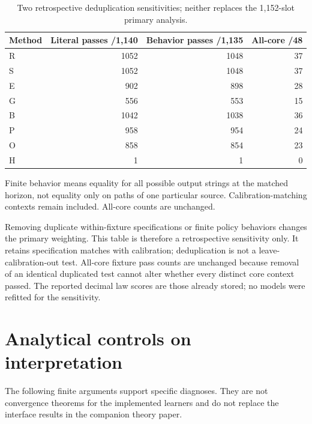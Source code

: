 \begin{table}[tbp]
\centering
\caption{Two retrospective deduplication sensitivities; neither replaces the 1,152-slot primary analysis.}\label{tab:dedup}
\small
\setlength{\tabcolsep}{5pt}
\begin{tabular}{lrrr}
\toprule
Method & Literal passes /1,140 & Behavior passes /1,135 & All-core /48 \\
\midrule
R & 1052 & 1048 & 37 \\
S & 1052 & 1048 & 37 \\
E & 902 & 898 & 28 \\
G & 556 & 553 & 15 \\
B & 1042 & 1038 & 36 \\
P & 958 & 954 & 24 \\
O & 858 & 854 & 23 \\
H & 1 & 1 & 0 \\
\bottomrule
\end{tabular}
\par\smallskip\begin{minipage}{\linewidth}\footnotesize Finite behavior means equality for all possible output strings at the matched horizon, not equality only on paths of one particular source. Calibration-matching contexts remain included. All-core counts are unchanged.\end{minipage}
\end{table}


\FloatBarrier
Removing duplicate within-fixture specifications or finite policy behaviors changes the primary weighting. This table is therefore a retrospective sensitivity only. It retains specification matches with calibration; deduplication is not a leave-calibration-out test. All-core fixture pass counts are unchanged because removal of an identical duplicated test cannot alter whether every distinct core context passed. The reported decimal law scores are those already stored; no models were refitted for the sensitivity.


\FloatBarrier

\section{Analytical controls on interpretation}
The following finite arguments support specific diagnoses. They are not convergence theorems for the implemented learners and do not replace the interface results in the companion theory paper.

